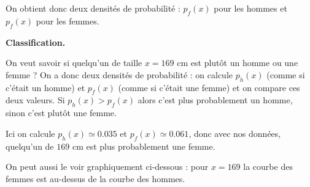 \documentclass[11pt,class=report,crop=false]{standalone}
\begin{document}
\begin{cours}
On obtient donc deux densités de probabilité : $p_f(x)$ pour les hommes et $p_f(x)$ pour les femmes.


\bigskip

\textbf{Classification.}

On veut savoir si quelqu'un de taille $x=169$ cm est plutôt un homme ou une femme ?
On a donc deux densités de probabilité : on calcule $p_h(x)$ (comme si c'était un homme) et $p_f(x)$ (comme si c'était une femme) et on compare ces deux valeurs.
Si $p_h(x)>p_f(x)$ alors c'est plus probablement un homme, sinon c'est plutôt une femme. 

Ici on calcule $p_h(x) \simeq 0.035$ et $p_f(x) \simeq 0.061$, donc avec nos données, quelqu'un de $169$ cm est plus probablement une femme.

On peut aussi le voir graphiquement ci-dessous : pour $x=169$ la courbe des femmes est au-dessus de la courbe des hommes. 


\end{cours}



\end{document}
